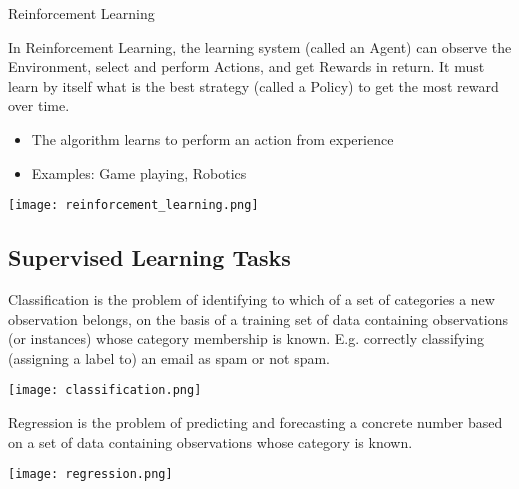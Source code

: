 \begin{concept}{Reinforcement Learning}

    \begin{minipage}{0.6\linewidth}
    In Reinforcement Learning, the learning system (called an Agent) can observe the Environment, select and perform Actions, and get Rewards in return. It must learn by itself what is the best strategy (called a Policy) to get the most reward over time.
    \begin{itemize}
        \item The algorithm learns to perform an action from experience
        \item Examples: Game playing, Robotics
    \end{itemize}
    \end{minipage}
    \begin{minipage}{0.38\linewidth}
    \texttt{[image: reinforcement\_learning.png]}
    \end{minipage}
\end{concept}

\subsection{Supervised Learning Tasks}


\begin{definition}{Classification}
    is the problem of identifying to which of a set of categories a new observation belongs, on the basis of a training set of data containing observations (or instances) whose category membership is known. 
    E.g. correctly classifying (assigning a label to) an email as spam or not spam.

    \texttt{[image: classification.png]}
\end{definition}

\begin{definition}{Regression}
    is the problem of predicting and forecasting a concrete number based on a set of data containing observations whose category is known.

    \texttt{[image: regression.png]}
\end{definition}

\raggedcolumns
\multend

